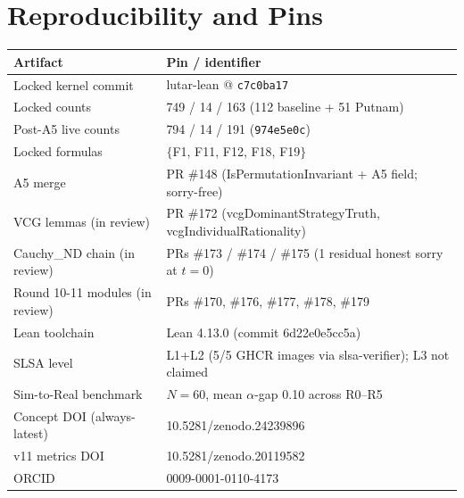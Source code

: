 \documentclass[11pt]{article}
\theoremstyle{plain}
\theoremstyle{definition}
\theoremstyle{remark}
\begin{document}
\section{Reproducibility and Pins}
\begin{center}
\begin{tabular}{@{}ll@{}}
\toprule
\textbf{Artifact} & \textbf{Pin / identifier} \\
\midrule
Locked kernel commit & lutar-lean @ \texttt{c7c0ba17} \\
Locked counts & 749 / 14 / 163 (112 baseline + 51 Putnam) \\
Post-A5 live counts & 794 / 14 / 191 (\texttt{974e5e0c}) \\
Locked formulas & $\{$F1, F11, F12, F18, F19$\}$ \\
A5 merge & PR \#148 (IsPermutationInvariant + A5 field; sorry-free) \\
VCG lemmas (in review) & PR \#172 (vcgDominantStrategyTruth, vcgIndividualRationality) \\
Cauchy\_ND chain (in review) & PRs \#173 / \#174 / \#175 (1 residual honest sorry at $t=0$) \\
Round 10-11 modules (in review) & PRs \#170, \#176, \#177, \#178, \#179 \\
Lean toolchain & Lean 4.13.0 (commit 6d22e0e5cc5a) \\
SLSA level & L1+L2 (5/5 GHCR images via slsa-verifier); L3 not claimed \\
Sim-to-Real benchmark & $N=60$, mean $\alpha$-gap 0.10 across R0--R5 \\
Concept DOI (always-latest) & 10.5281/zenodo.24239896 \\
v11 metrics DOI & 10.5281/zenodo.20119582 \\
ORCID & 0009-0001-0110-4173 \\
\bottomrule
\end{tabular}
\end{center}
\end{document}
